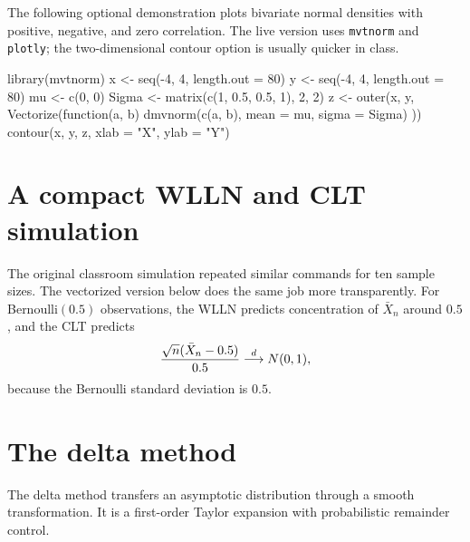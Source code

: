 The following optional demonstration plots bivariate normal densities with
positive, negative, and zero correlation.  The live version uses
\texttt{mvtnorm} and \texttt{plotly}; the two-dimensional contour option is
usually quicker in class.

\begin{rcode}
library(mvtnorm)
x <- seq(-4, 4, length.out = 80)
y <- seq(-4, 4, length.out = 80)
mu <- c(0, 0)
Sigma <- matrix(c(1, 0.5, 0.5, 1), 2, 2)
z <- outer(x, y, Vectorize(function(a, b) {
  dmvnorm(c(a, b), mean = mu, sigma = Sigma)
}))
contour(x, y, z, xlab = "X", ylab = "Y")
\end{rcode}

\section{A compact WLLN and CLT simulation}

The original classroom simulation repeated similar commands for ten sample
sizes.  The vectorized version below does the same job more transparently.
For Bernoulli$(0.5)$ observations, the WLLN predicts concentration of
$\bar X_n$ around $0.5$, and the CLT predicts
\[
  \frac{\sqrt n(\bar X_n-0.5)}{0.5}\overset{d}{\longrightarrow} N(0,1),
\]
because the Bernoulli standard deviation is $0.5$.


\section{The delta method}

The delta method transfers an asymptotic distribution through a smooth
transformation.  It is a first-order Taylor expansion with probabilistic
remainder control.


